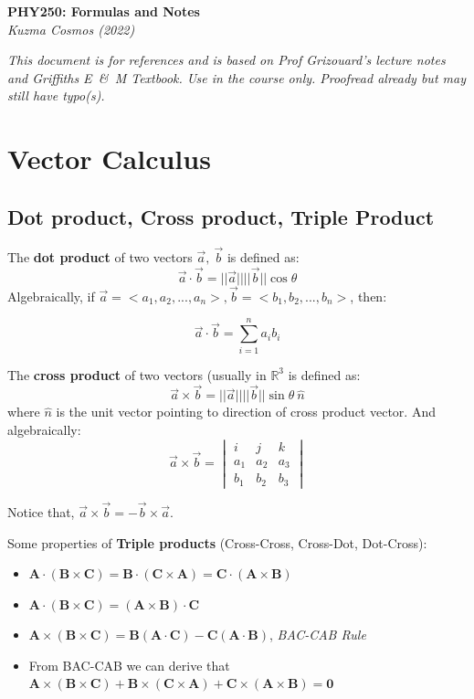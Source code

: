 \documentclass[12pt,a4paper,twoside]{article}
\numberwithin{equation}{section}
\begin{document}
	\begin{center}
		\textbf{\Large{PHY250: Formulas and Notes}}\\
		\textit{Kuzma Cosmos (2022)}
	\end{center}
	\textit{This document is for references and is based on Prof Grizouard's lecture notes and Griffiths E\ \&\ M Textbook. Use in the course only. Proofread already but may still have typo(s).}
	\tableofcontents
	\newpage
	
\section{Vector Calculus}
	\subsection{Dot product, Cross product, Triple Product}
	The \textbf{dot product} of two vectors \(\overrightarrow{a},\ \overrightarrow{b}\) is defined as:
	\begin{equation}
		\overrightarrow{a}\cdot \overrightarrow{b}=||\overrightarrow{a}||||\overrightarrow{b}||\cos\theta
	\end{equation}
	Algebraically, if \(\overrightarrow{a}=<a_1, a_2, ..., a_n>,\overrightarrow{b}=<b_1, b_2,..., b_n>\), then:
	
	\[\overrightarrow{a}\cdot \overrightarrow{b}=\sum_{i=1}^n a_ib_i\]
	
	\noindent The \textbf{cross product} of two vectors (usually in \(\mathbb{R}^3\) is defined as:
	\begin{equation}
		\overrightarrow{a}\times \overrightarrow {b}=||\overrightarrow{a}||||\overrightarrow{b}||\sin\theta\ \hat{n}
	\end{equation}
	where \(\hat{n}\) is the unit vector pointing to direction of cross product vector. And algebraically:
	\[\overrightarrow{a}\times \overrightarrow{b}=\begin{vmatrix} i& j &k \\ a_1 &a_2  &a_3 \\b_1  &b_2  &b_3 \end{vmatrix}\]
	
	\noindent Notice that, \(\overrightarrow{a}\times \overrightarrow{b}=-\overrightarrow{b}\times \overrightarrow{a}\).
	
	\noindent Some properties of \textbf{Triple products} (Cross-Cross, Cross-Dot, Dot-Cross):
	\begin{itemize}
		\item \(\textbf{A}\cdot (\textbf{B}\times \textbf{C})= \textbf{B}\cdot (\textbf{C}\times \textbf{A})=\textbf{C}\cdot (\textbf{A}\times \textbf{B})\)
		\item \(\textbf{A}\cdot(\textbf{B}\times \textbf{C})=(\textbf{A}\times \textbf{B})\cdot \textbf{C}\)
		\item \(\textbf{A}\times(\textbf{B}\times \textbf{C})=\textbf{B}(\textbf{A}\cdot \textbf{C})-\textbf{C}(\textbf{A}\cdot \textbf{B})\), \textit{BAC-CAB Rule}
		\item From BAC-CAB we can derive that \(\textbf{A}\times(\textbf{B}\times \textbf{C})+\textbf{B}\times(\textbf{C}\times \textbf{A})+\textbf{C}\times(\textbf{A}\times \textbf{B})=\textbf{0}\)
	\end{itemize}
\end{document}
